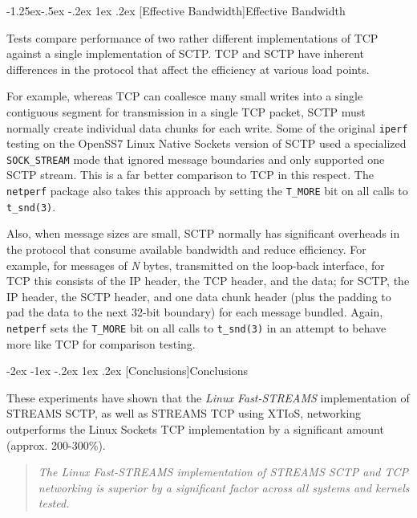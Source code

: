 \documentclass[letterpaper,final,notitlepage,twocolumn,10pt,twoside]{article}
\makeatletter
\renewcommand\section{\@startsection {section}{1}{\z@}%
                                   {-2ex \@plus -1ex \@minus -.2ex}%
                                   {1ex \@plus .2ex}%
                                   {\normalfont\large\bfseries}}
\renewcommand\subsubsection{\@startsection{subsubsection}{3}{\z@}%
                                     {-1.25ex\@plus -.5ex \@minus -.2ex}%
                                     {1ex \@plus .2ex}%
                                     {\normalfont\normalsize\bfseries}}
\makeatother
\begin{document}
\subsubsection[Effective Bandwidth]{Effective Bandwidth}

Tests compare performance of two rather different implementations of TCP against a single
implementation of SCTP.  TCP and SCTP have inherent differences in the protocol that affect the
efficiency at various load points.

For example, whereas TCP can coallesce many small writes into a single contiguous segment for
transmission in a single TCP packet, SCTP must normally create individual data chunks for each
write.  Some of the original \texttt{iperf} testing on the OpenSS7 Linux Native Sockets version of
SCTP used a specialized \texttt{SOCK\_STREAM} mode that ignored message boundaries and only
supported one SCTP stream.  This is a far better comparison to TCP in this respect.  The
\texttt{netperf} package also takes this approach by setting the \texttt{T\_MORE} bit on all calls
to \texttt{t\_snd(3)}.

Also, when message sizes are small, SCTP normally has significant overheads in the protocol that
consume available bandwidth and reduce efficiency.  For example, for messages of \textsl{N} bytes,
transmitted on the loop-back interface, for TCP this consists of the IP header, the TCP header, and
the data; for SCTP, the IP header, the SCTP header, and one data chunk header (plus the padding to
pad the data to the next 32-bit boundary) for each message bundled.  Again, \texttt{netperf} sets
the \texttt{T\_MORE} bit on all calls to \texttt{t\_snd(3)} in an attempt to behave more like TCP
for comparison testing.

\section[Conclusions]{Conclusions}

These experiments have shown that the \textsl{Linux Fast-STREAMS} implementation of STREAMS SCTP,
as well as STREAMS TCP using XTIoS, networking outperforms the Linux Sockets TCP implementation by a
significant amount (approx. 200-300\%).

\begin{quote}
\textit{The \textsl{Linux Fast-STREAMS} implementation of STREAMS SCTP and TCP networking is
superior by a significant factor across all systems and kernels tested.}
\end{quote}
\end{document}
